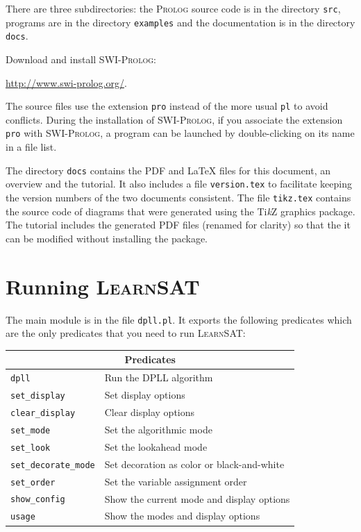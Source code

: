 \documentclass[11pt]{article}
\newcommand*{\p}[1]{\textup{\texttt{#1}}}
\newcommand*{\ls}{\textsc{LearnSAT}}
\newcommand*{\pl}{\textsc{Prolog}}
\newcommand*{\sw}{\textsc{SWI-Prolog}}
\begin{document}
There are three subdirectories: the \pl{} source code is in the directory \p{src}, programs are in the directory \p{examples} and the documentation is in the directory \p{docs}.

Download and install \sw{}:
\begin{center}
\url{http://www.swi-prolog.org/}.
\end{center}

The source files use the extension \p{pro} instead of the more usual
\p{pl} to avoid conflicts. During the installation
of \sw{}, if you associate the extension \p{pro} with \sw{}, a
program can be launched by double-clicking on its name in a file list. 

The directory \p{docs} contains the PDF and \LaTeX{} files for this document, an overview and the tutorial. It also includes a file \p{version.tex} to facilitate keeping the version numbers of the two documents consistent. The file \p{tikz.tex} contains the source code of diagrams that were generated using the Ti\textit{k}Z graphics package. The tutorial includes the generated PDF files (renamed for clarity) so that the it can be modified without installing the package.


\section{Running \ls}

The main module is in the file \p{dpll.pl}. It exports the following
predicates which are the only predicates that you need to run \ls{}:

\begin{center}
\begin{tabular}{|l|l|}
\hline
\multicolumn{2}{|c|}{\textbf{\large Predicates}}\\
\hline
\p{dpll}&Run the DPLL algorithm\\
\p{set\_display}&Set display options\\
\p{clear\_display}&Clear display options\\
\p{set\_mode}&Set the algorithmic mode\\
\p{set\_look}&Set the lookahead mode\\
\p{set\_decorate\_mode} & Set decoration as color or black-and-white\\ 
\p{set\_order}&Set the variable assignment order\\
\p{show\_config}&Show the current mode and display options\\
\p{usage}&Show the modes and display options \\
\hline
\end{tabular}
\end{center}
\end{document}
